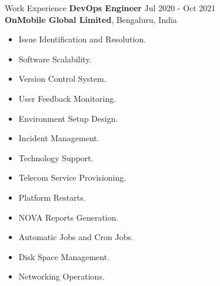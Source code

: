 \documentclass{resume} %
\begin{document}
\begin{rSection}{Work Experience}
\textbf{DevOps Engineer} \hfill Jul 2020 - Oct 2021\\
\textbf{OnMobile Global Limited}, Bengaluru, India
\begin{itemize}
    \item Issue Identification and Resolution.
    \item Software Scalability.
    \item Version Control System.
    \item User Feedback Monitoring.
    \item Environment Setup Design.
    \item Incident Management.
    \item Technology Support.
    \item Telecom Service Provisioning.
    \item Platform Restarts.
    \item NOVA Reports Generation.
    \item Automatic Jobs and Cron Jobs.
    \item Disk Space Management.
    \item Networking Operations.
\end{itemize}
\end{rSection}

\end{document}
